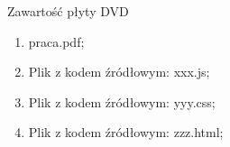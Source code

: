 \cleardoublepage
{}
\thispagestyle{plain}

{}

Zawartość płyty DVD
\begin{enumerate}
\item praca.pdf;
\item Plik z kodem źródłowym: xxx.js;
\item Plik z kodem źródłowym: yyy.css;
\item Plik z kodem źródłowym: zzz.html;
\end{enumerate}
